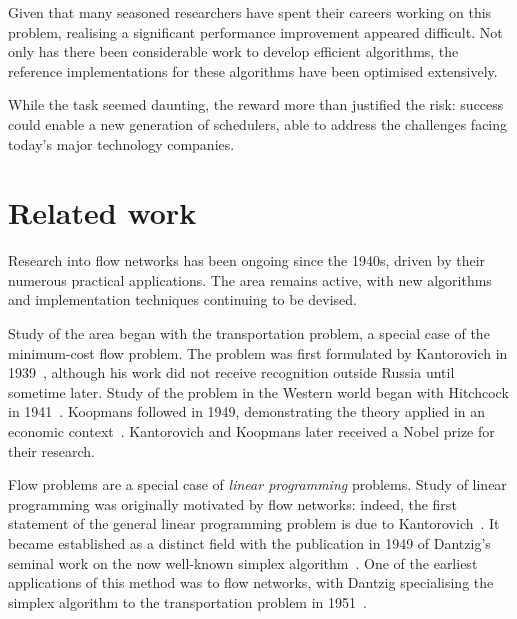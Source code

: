 Given that many seasoned researchers have spent their careers working on this problem, realising a significant performance improvement appeared difficult. Not only has there been considerable work to develop efficient algorithms, the reference implementations for these algorithms have been optimised extensively.

While the task seemed daunting, the reward more than justified the risk: success could enable a new generation of schedulers, able to address the challenges facing today's major technology companies.

\section{Related work} \label{sec:intro-related-work}

Research into flow networks has been ongoing since the 1940s, driven by their numerous practical applications. The area remains active, with new algorithms and implementation techniques continuing to be devised.

Study of the area began with the transportation problem, a special case of the minimum-cost flow problem. The problem was first formulated by Kantorovich in 1939~\cite{Kantorovich:1960}, although his work did not receive recognition outside Russia until sometime later. Study of the problem in the Western world began with Hitchcock in 1941~\cite{Hitchcock:1941}. Koopmans followed in 1949, demonstrating the theory applied in an economic context~\cite{Koopmans:1949}. Kantorovich and Koopmans later received a Nobel prize for their research\footnotemark.

Flow problems are a special case of \emph{linear programming} problems. Study of linear programming was originally motivated by flow networks: indeed, the first statement of the general linear programming problem is due to Kantorovich~\cite{Kantorovich:1960}. It became established as a distinct field with the publication in 1949 of Dantzig's seminal work on the now well-known simplex algorithm~\cite{Dantzig:1949}. One of the earliest applications of this method was to flow networks, with Dantzig specialising the simplex algorithm to the transportation problem in 1951~\cite{Dantzig:1951}.


